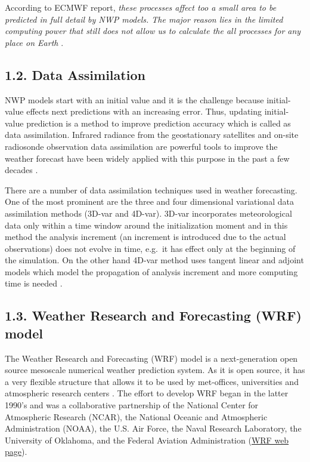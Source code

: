 \documentclass[
  letterpaper,
  DIV=11,
  numbers=noendperiod,
  abstract]{scrartcl}
\begin{document}
According to ECMWF report, \emph{these processes affect too a small area
to be predicted in full detail by NWP models. The major reason lies in
the limited computing power that still does not allow us to calculate
the all processes for any place on Earth} \autocite{frnda2022}.

\hypertarget{data-assimilation}{%
\subsection{1.2. Data Assimilation}\label{data-assimilation}}

NWP models start with an initial value and it is the challenge because
initial-value effects next predictions with an increasing error. Thus,
updating initial-value prediction is a method to improve prediction
accuracy which is called as data assimilation. Infrared radiance from
the geostationary satellites and on-site radiosonde observation data
assimilation are powerful tools to improve the weather forecast have
been widely applied with this purpose in the past a few decades
\autocite{geer2018}.

There are a number of data assimilation techniques used in weather
forecasting. One of the most prominent are the three and four
dimensional variational data assimilation methods (3D-var and 4D-var).
3D-var incorporates meteorological data only within a time window around
the initialization moment and in this method the analysis increment (an
increment is introduced due to the actual observations) does not evolve
in time, e.g.~it has effect only at the beginning of the simulation. On
the other hand 4D-var method uses tangent linear and adjoint models
which model the propagation of analysis increment and more computing
time is needed \autocite{vladimirov2020}.

\hypertarget{weather-research-and-forecasting-wrf-model}{%
\subsection{1.3. Weather Research and Forecasting (WRF)
model}\label{weather-research-and-forecasting-wrf-model}}

The Weather Research and Forecasting (WRF) model is a next-generation
open source mesoscale numerical weather prediction system. As it is open
source, it has a very flexible structure that allows it to be used by
met-offices, universities and atmospheric research centers
\autocite{powers2017}. The effort to develop WRF began in the latter
1990's and was a collaborative partnership of the National Center for
Atmospheric Research (NCAR), the National Oceanic and Atmospheric
Administration (NOAA), the U.S. Air Force, the Naval Research
Laboratory, the University of Oklahoma, and the Federal Aviation
Administration (\href{https://www.mmm.ucar.edu/models/wrf}{WRF web
page}).
\end{document}
